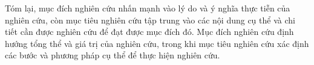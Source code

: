 Tóm lại, mục đích nghiên cứu nhấn mạnh vào lý do và ý nghĩa thực tiễn của nghiên cứu, còn mục tiêu nghiên cứu tập trung vào các nội dung cụ thể và chi tiết cần được nghiên cứu để đạt được mục đích đó. Mục đích nghiên cứu định hướng tổng thể và giá trị của nghiên cứu, trong khi mục tiêu nghiên cứu xác định các bước và phương pháp cụ thể để thực hiện nghiên cứu.